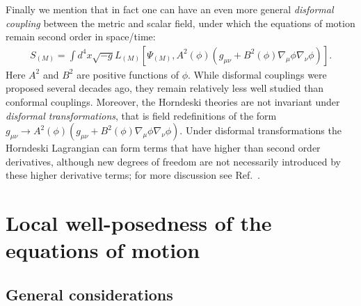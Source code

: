 \documentclass{ws-ijmpd}
\begin{document}
Finally we mention that in fact one can have an even more general
\emph{disformal coupling} between the metric and 
scalar field\cite{Bekenstein:1992pj}, under which the equations of
motion remain second order in space/time:
\begin{align}
   S_{(M)}
   =
   \int d^4x\sqrt{-g}L_{(M)}\left[
      \Psi_{(M)},A^2\left(\phi\right)
      \left(
         g_{\mu\nu}
         +
         B^2\left(\phi\right)\nabla_{\mu}\phi\nabla_{\nu}\phi
      \right)
   \right]
   .
\end{align}
Here $A^2$ and $B^2$ are positive functions of $\phi$.
While disformal couplings were proposed several decades 
ago\cite{Bekenstein:1992pj}, they remain relatively less well studied
than conformal couplings.
Moreover, the Horndeski theories are not invariant under \emph{disformal
transformations}, that is field redefinitions of the form 
$g_{\mu\nu}\to
      A^2\left(\phi\right)
      \left(
         g_{\mu\nu}
         +
         B^2\left(\phi\right)\nabla_{\mu}\phi\nabla_{\nu}\phi
      \right)$.
Under disformal transformations the Horndeski Lagrangian can form
terms that have higher than second order derivatives, although
new degrees of freedom are not necessarily introduced by these
higher derivative terms; 
for more discussion see Ref.~.
\section{Local well-posedness of the equations of motion
\label{sec:local_well_posedness}
}
\subsection{General considerations\label{sec:general_considerations}}
	
\end{document}
